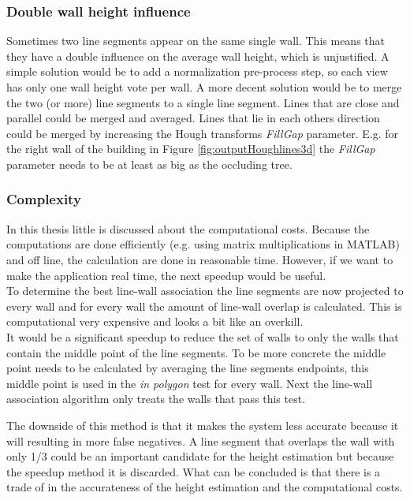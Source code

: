 \subsubsection{Double wall height influence}
Sometimes two line segments appear on the same single wall. This means that they have a double
influence on the average wall height, which is unjustified. 
A simple solution would be to add a normalization pre-process step, so each view
has only one wall height vote per wall. A more decent solution would be to
merge the two (or more) line segments to a single line segment. 
Lines that are close and parallel could be merged and averaged.
Lines that lie in each others direction could be merged by increasing the 
Hough transforms \emph{FillGap} parameter.  E.g. for the right wall of the building in 
Figure \ref{fig:outputHoughlines3d} the \emph{FillGap} parameter needs to be at
least as big as the occluding tree.

\subsubsection{Complexity}
In this thesis little is discussed about the computational costs. Because the 
computations are done efficiently (e.g. using matrix multiplications
in MATLAB) and off line, the calculation are done in reasonable time.
However, if we want to make the application real time, the next speedup would be useful.\\
To determine the best line-wall association the line segments are now projected to
every wall and for every wall the amount of line-wall overlap is calculated. This
is computational very expensive and looks a bit like an overkill.\\

It would be a significant speedup to reduce the set of walls to only the walls
that contain the middle point of the line segments. To be more concrete the
middle point needs to be calculated by averaging the line segments endpoints,
this middle point is used in the \emph{in polygon} test for every wall.  Next the
line-wall association algorithm only treats the walls that pass this test.

The downside of this method is that it makes the system less accurate because it
will resulting in more false negatives. A line segment that overlaps the wall with only 1/3 could be an
important candidate for the height estimation but because the speedup method it is discarded.
What can be concluded is that there is a trade of in the accurateness of the
height estimation and the computational costs.


